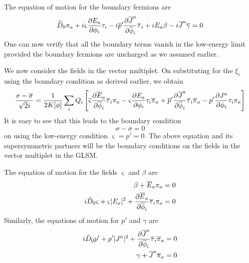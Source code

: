 \documentclass[a4paper,12pt]{article}
\begin{document}
The equation of motion for the boundary fermions are
\begin{equation}
\widetilde{D}_0 \pi_a + i
\varsigma{{\partial E_a}\over{\partial\phi_i}} \tau_i
-i \overline{p}'{{\partial \overline{J}^a}\over{\partial\overline{\phi}_i}}
\overline{\tau}_i+iE_a \beta   
-i \overline{J}^a \overline{\gamma} =0
\end{equation}
One can now verify that all the boundary terms vanish in the low-energy limit
provided the boundary fermions are uncharged as we assumed earlier. 


We now consider the  fields in the vector multiplet. 
On substituting for the $\xi_i$ using the boundary condition as derived earlier,
we obtain 
\begin{equation}
{{\sigma - \overline{\sigma}}\over{\sqrt2 i}} ={1\over{2K[\phi]}} \sum_i
Q_i\left[ 
\overline{\varsigma}
{{\partial \overline{E}_a}\over{\partial\overline{\phi}_i}}
\overline{\tau}_i \pi_a 
-\varsigma{{\partial E_a}\over{\partial\phi_i}} \tau_i \overline{\pi}_a
+ \overline{p}' {{\partial \overline{J}^a}\over{\partial\overline{\phi}_i}}
\overline{\tau}_i \overline{\pi}_a 
-p'{{\partial J^a}\over{\partial\phi_i}} \tau_i \pi_a
\right] 
\end{equation}
It is easy to see that this leads to the boundary condition
\begin{equation}
\sigma - \overline{\sigma}= 0
\end{equation}
on using the low-energy condition $\varsigma=p'=0$. The above equation
and its supersymmetric partners will be  the boundary
conditions on the fields in the vector multiplet in the GLSM.

The equation of motion for the fields $\varsigma$ and $\beta$ are
\begin{eqnarray}
\beta + \overline{E}_a \pi_a = 0 \\
i\tilde{D}_0 \varsigma +\varsigma |E_a|^2+ 
{{\partial\overline{E}_a}\over {\partial\overline{\phi}_i}}
\overline{\tau}_i \pi_a =0 
\end{eqnarray}
Similarly, the equations of motion  for $p'$ and $\gamma$ are
\begin{eqnarray}
i\tilde{D}_0 p' + p' |J^a|^2 +
{{\partial \overline{J}^a}\over {\partial\overline{\phi}_i}}
\overline{\tau}_i \overline{\pi}_a =0 \\
\gamma + \overline{J}^a \overline{\pi}_a = 0
\end{eqnarray}
\end{document}
